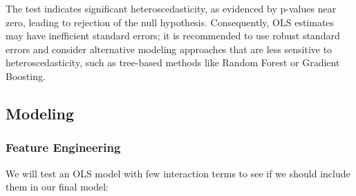 \documentclass[9pt]{article}
\begin{document}
The test indicates significant heteroscedasticity, as evidenced by
p-values near zero, leading to rejection of the null hypothesis.
Consequently, OLS estimates may have inefficient standard errors; it is
recommended to use robust standard errors and consider alternative
modeling approaches that are less sensitive to heteroscedasticity, such
as tree-based methods like Random Forest or Gradient Boosting.

    \hypertarget{modeling}{%
\subsection{Modeling}\label{modeling}}

    \hypertarget{feature-engineering}{%
\subsubsection{Feature Engineering}\label{feature-engineering}}

We will test an OLS model with few interaction terms to see if we should
include them in our final model:
\end{document}
